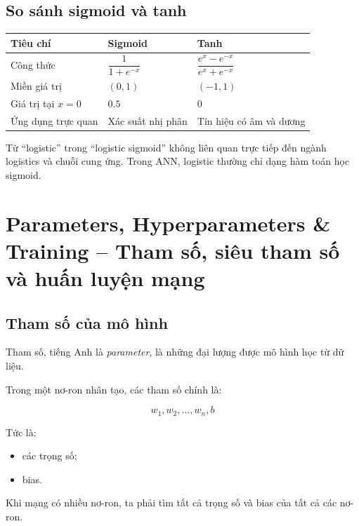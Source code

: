 \subsection{So sánh sigmoid và tanh}

\begin{center}
\begin{tabular}{lll}
\toprule
Tiêu chí & Sigmoid & Tanh \\
\midrule
Công thức & $\dfrac{1}{1+e^{-x}}$ & $\dfrac{e^x-e^{-x}}{e^x+e^{-x}}$ \\
Miền giá trị & $(0,1)$ & $(-1,1)$ \\
Giá trị tại $x=0$ & $0.5$ & $0$ \\
Ứng dụng trực quan & Xác suất nhị phân & Tín hiệu có âm và dương \\
\bottomrule
\end{tabular}
\end{center}

\begin{canhbao}
Từ ``logistic'' trong ``logistic sigmoid'' không liên quan trực tiếp đến ngành logistics và chuỗi cung ứng. Trong ANN, logistic thường chỉ dạng hàm toán học sigmoid.
\end{canhbao}

\section{Parameters, Hyperparameters \& Training -- Tham số, siêu tham số và huấn luyện mạng}

\subsection{Tham số của mô hình}

Tham số, tiếng Anh là \textit{parameter}, là những đại lượng được mô hình học từ dữ liệu.

Trong một nơ-ron nhân tạo, các tham số chính là:

\[
    w_1, w_2, \ldots, w_n, b
\]

Tức là:

\begin{itemize}
    \item các trọng số;
    \item bias.
\end{itemize}

Khi mạng có nhiều nơ-ron, ta phải tìm tất cả trọng số và bias của tất cả các nơ-ron.

